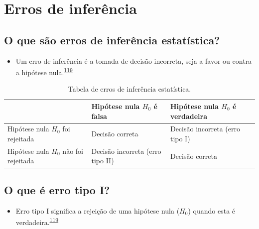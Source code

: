 \documentclass[
  a4paper,
]{book}
\providecommand{\tightlist}{%
  \setlength{\itemsep}{0pt}\setlength{\parskip}{0pt}}
\begin{document}
\hypertarget{erros-de-inferuxeancia}{%
\section{Erros de inferência}\label{erros-de-inferuxeancia}}

\hypertarget{o-que-suxe3o-erros-de-inferuxeancia-estatuxedstica}{%
\subsection{O que são erros de inferência estatística?}\label{o-que-suxe3o-erros-de-inferuxeancia-estatuxedstica}}

\begin{itemize}
\tightlist
\item
  Um erro de inferência é a tomada de decisão incorreta, seja a favor ou contra a hipótese nula.\textsuperscript{\protect\hyperlink{ref-Curran-Everett2009}{119}}
\end{itemize}

\begin{table}

\caption{\label{tab:erros-interencia}Tabela de erros de inferência estatística.}
\centering
\begin{tabu} to 
\toprule
  & Hipótese nula $H_{0}$ 
 é falsa & Hipótese nula $H_{0}$ 
\textbf{ é verdadeira}\\
\midrule
Hipótese nula $H_{0}$ 
 foi rejeitada & Decisão correta & Decisão incorreta 
 (erro tipo I)\\
Hipótese nula $H_{0}$ 
 não foi rejeitada & Decisão incorreta 
 (erro tipo II) & Decisão correta\\
\bottomrule
\end{tabu}
\end{table}

\hypertarget{o-que-uxe9-erro-tipo-i}{%
\subsection{O que é erro tipo I?}\label{o-que-uxe9-erro-tipo-i}}

\begin{itemize}
\tightlist
\item
  Erro tipo I significa a rejeição de uma hipótese nula (\(H_{0}\)) quando esta é verdadeira.\textsuperscript{\protect\hyperlink{ref-Curran-Everett2009}{119}}
\end{itemize}
\end{document}
